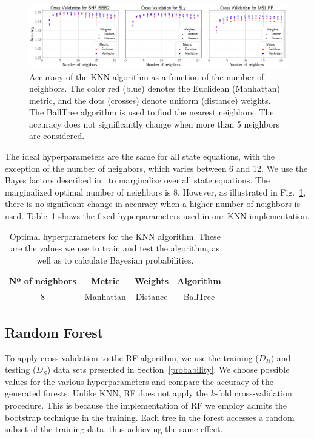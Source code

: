 \begin{figure}%
\includegraphics[width=\linewidth]{cross_val_KNN}
\caption{Accuracy of the \ac{KNN} algorithm as a function of the number of neighbors. The color red (blue) denotes the Euclidean (Manhattan) metric, and the dots (crosses) denote uniform (distance) weights. The BallTree algorithm is used to find the nearest neighbors. The accuracy does not significantly change when more than 5 neighbors are considered.}
\label{fig:crossvalKNN}
\end{figure}

The ideal hyperparameters are the same for all state equations, with the exception of the number of neighbors, which varies between 6 and 12.  We use the Bayes factors described in~\cite{Ghosh:2021eqv} to marginalize over all state equations. The marginalized optimal number of neighbors is 8. However, as illustrated in Fig.~\ref{fig:crossvalKNN}, there is no significant change in accuracy when a higher number of neighbors is used. Table~\ref{tab:KNN_opt_params} shows the fixed hyperparameters used in our KNN implementation.

\begin{table}[h]
\begin{tabular}{c|c|c|c}
\hline
Nº of neighbors   & Metric & Weights & Algorithm  \\ \hline
8  & Manhattan  & Distance & BallTree \\ 
\hline
\end{tabular}
\caption{Optimal hyperparameters for the \ac{KNN} algorithm. These are the values we use to train and test the algorithm, as well as to calculate Bayesian probabilities.} \label{tab:KNN_opt_params}
\end{table}


\subsection{Random Forest}

To apply cross-validation to the \ac{RF} algorithm, we use the training ($D_R$) and testing ($D_S$) data sets presented in Section~\ref{probability}. We choose possible values for the various hyperparameters and compare the accuracy of the generated forests. Unlike \ac{KNN}, \ac{RF} does not apply the $k$-fold cross-validation procedure. This is because the implementation of \ac{RF} we employ admits the bootstrap technique in the training. Each tree in the forest accesses a random subset of the training data, thus achieving the same effect.

